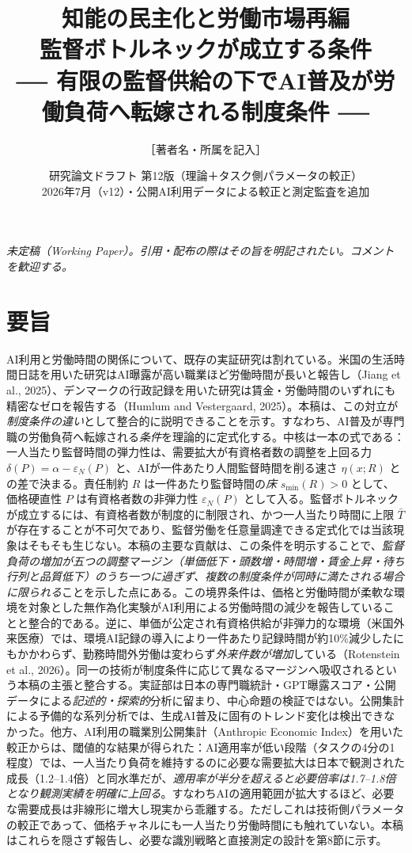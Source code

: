 \documentclass[11pt]{article}
\title{\bfseries 知能の民主化と労働市場再編\\[2pt]
\large 監督ボトルネックが成立する条件\\[2pt]
\normalsize ── 有限の監督供給の下でAI普及が労働負荷へ転嫁される制度条件 ──}
\author{\normalsize ［著者名・所属を記入］}
\date{\normalsize 研究論文ドラフト 第12版（理論＋タスク側パラメータの較正）\\ 2026年7月（v12）・公開AI利用データによる較正と測定監査を追加}
\theoremstyle{plain}
\theoremstyle{definition}
\theoremstyle{remark}
\begin{document}
\maketitle
\thispagestyle{empty}

\begin{center}
\small\itshape 未定稿（Working Paper）。引用・配布の際はその旨を明記されたい。コメントを歓迎する。
\end{center}
\vspace{2mm}
\section*{要旨}
\small
AI利用と労働時間の関係について、既存の実証研究は割れている。米国の生活時間日誌を用いた研究はAI曝露が高い職業ほど労働時間が長いと報告し（Jiang et al., 2025）、デンマークの行政記録を用いた研究は賃金・労働時間のいずれにも精密なゼロを報告する（Humlum and Vestergaard, 2025）。本稿は、この対立が\emph{制度条件の違い}として整合的に説明できることを示す。すなわち、AI普及が専門職の労働負荷へ転嫁される\emph{条件}を理論的に定式化する。中核は一本の式である：一人当たり監督時間の弾力性は、需要拡大が有資格者数の調整を上回る力 $\delta(P)=\alpha-\varepsilon_N(P)$ と、AIが一件あたり人間監督時間を削る速さ $\eta(x;R)$ との差で決まる。責任制約 $R$ は一件あたり監督時間の\emph{床} $s_{\min}(R)>0$ として、価格硬直性 $P$ は有資格者数の非弾力性 $\varepsilon_N(P)$ として入る。監督ボトルネックが成立するには、有資格者数が制度的に制限され、かつ一人当たり時間に上限 $\bar T$ が存在することが不可欠であり、監督労働を任意量調達できる定式化では当該現象はそもそも生じない。本稿の主要な貢献は、この条件を明示することで、\emph{監督負荷の増加が五つの調整マージン（単価低下・頭数増・時間増・賃金上昇・待ち行列と品質低下）のうち一つに過ぎず、複数の制度条件が同時に満たされる場合に限られる}ことを示した点にある。この境界条件は、価格と労働時間が柔軟な環境を対象とした無作為化実験がAI利用による労働時間の減少を報告していることと整合的である。逆に、単価が公定され有資格供給が非弾力的な環境（米国外来医療）では、環境AI記録の導入により一件あたり記録時間が約10\%減少したにもかかわらず、勤務時間外労働は変わらず\emph{外来件数が増加}している（Rotenstein et al., 2026）。同一の技術が制度条件に応じて異なるマージンへ吸収されるという本稿の主張と整合する。実証部は日本の専門職統計・GPT曝露スコア・公開データによる\emph{記述的・探索的}分析に留まり、中心命題の検証ではない。公開集計による予備的な系列分析では、生成AI普及に固有のトレンド変化は検出できなかった。他方、AI利用の職業別公開集計（Anthropic Economic Index）を用いた較正からは、閾値的な結果が得られた：AI適用率が低い段階（タスクの4分の1程度）では、一人当たり負荷を維持するのに必要な需要拡大は日本で観測された成長（1.2--1.4倍）と同水準だが、\emph{適用率が半分を超えると必要倍率は1.7--1.8倍となり観測実績を明確に上回る}。すなわちAIの適用範囲が拡大するほど、必要な需要成長は非線形に増大し現実から乖離する。ただしこれは技術側パラメータの較正であって、価格チャネルにも一人当たり労働時間にも触れていない。本稿はこれらを隠さず報告し、必要な識別戦略と直接測定の設計を第8節に示す。\par
\end{document}
